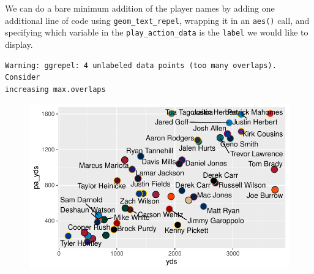 \documentclass[
  letterpaper,
]{krantz}
\newenvironment{Shaded}{\begin{snugshade}}{\end{snugshade}}
\newcommand{\AttributeTok}[1]{\textcolor[rgb]{0.40,0.45,0.13}{#1}}
\newcommand{\DecValTok}[1]{\textcolor[rgb]{0.68,0.00,0.00}{#1}}
\newcommand{\FloatTok}[1]{\textcolor[rgb]{0.68,0.00,0.00}{#1}}
\newcommand{\FunctionTok}[1]{\textcolor[rgb]{0.28,0.35,0.67}{#1}}
\newcommand{\NormalTok}[1]{\textcolor[rgb]{0.00,0.23,0.31}{#1}}
\newcommand{\SpecialCharTok}[1]{\textcolor[rgb]{0.37,0.37,0.37}{#1}}
\begin{document}
We can do a bare minimum addition of the player names by adding one
additional line of code using \texttt{geom\_text\_repel}, wrapping it in
an \texttt{aes()} call, and specifying which variable in the
\texttt{play\_action\_data} is the \texttt{label} we would like to
display.

\begin{Shaded}
\end{Shaded}

\begin{verbatim}
Warning: ggrepel: 4 unlabeled data points (too many overlaps). Consider
increasing max.overlaps
\end{verbatim}

\begin{figure}[H]

{\centering \includegraphics{04-nfl-analytics-visualization_files/figure-pdf/basic-addition-of-player-name-1.pdf}

}

\end{figure}
\end{document}
